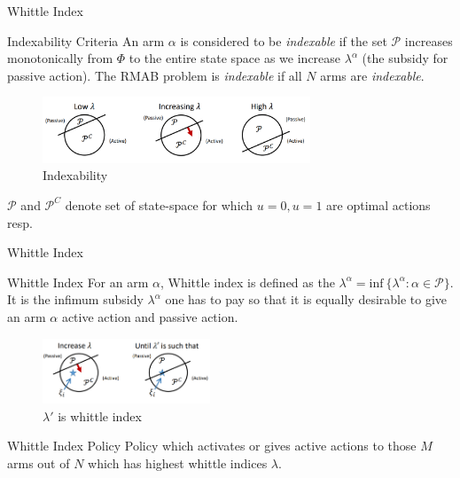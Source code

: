 \documentclass{beamer}
\begin{document}
\begin{frame}{Whittle Index}
    \begin{block}{Indexability Criteria}
    An arm $\alpha$ is considered to be \textit{indexable} if the set $\mathcal{P}$ increases monotonically from $\Phi$ to the entire state space as we increase $\lambda^\alpha$ (the subsidy for passive action). The RMAB problem is \textit{indexable} if all $N$ arms are \textit{indexable}.
    \end{block}
\begin{figure}
    \centering
    \includegraphics[width=8cm]{whittle1.png}
    \caption{Indexability}
    \label{fig:my_label}
\end{figure}
$\mathcal{P}$ and $\mathcal{P}^C$ denote set of state-space for which $u = 0, u = 1$ are optimal actions resp.

\end{frame}

\begin{frame}{Whittle Index}
    \begin{block}{Whittle Index}
    For an arm $\alpha$, Whittle index is defined as the $\lambda^\alpha = \text{inf}\ \{\lambda^\alpha: \alpha \in \mathcal{P}\}$. It is the infimum subsidy $\lambda^\alpha$ one has to pay so that it is equally desirable to give an arm $\alpha$ active action and passive action.
    \end{block}
\begin{figure}
    \centering
    \includegraphics[width=5cm]{whittle2.png}
    \caption{$\lambda'$ is whittle index}
    \label{fig:my_label}
\end{figure}   
\begin{block}{Whittle Index Policy}
Policy which activates or gives active actions to those $M$ arms out of $N$ which has highest whittle indices $\lambda$.  
\end{block}
\end{frame}
\end{document}
